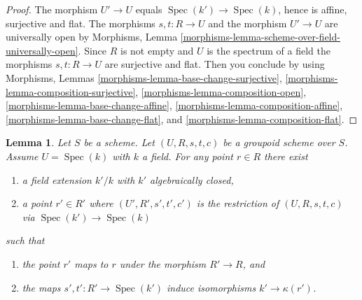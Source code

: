 \documentclass{stacks-project}
\theoremstyle{plain}
\newtheorem{lemma}[subsection]{Lemma}
\theoremstyle{definition}
\theoremstyle{remark}
\numberwithin{equation}{subsection}
\def\Spec{\mathop{\mathrm{Spec}}}
\begin{document}
\begin{proof}
The morphism $U' \to U$ equals $\Spec(k') \to \Spec(k)$,
hence is affine, surjective and flat. The morphisms $s, t : R \to U$
and the morphism $U' \to U$ are universally open by
Morphisms, Lemma \ref{morphisms-lemma-scheme-over-field-universally-open}.
Since $R$ is not empty and $U$ is the spectrum of a field the morphisms
$s, t : R \to U$ are surjective and flat. Then you conclude by using
Morphisms, Lemmas \ref{morphisms-lemma-base-change-surjective},
\ref{morphisms-lemma-composition-surjective},
\ref{morphisms-lemma-composition-open},
\ref{morphisms-lemma-base-change-affine},
\ref{morphisms-lemma-composition-affine},
\ref{morphisms-lemma-base-change-flat}, and
\ref{morphisms-lemma-composition-flat}.
\end{proof}

\begin{lemma}
\label{lemma-groupoid-on-field-explain-points}
Let $S$ be a scheme. Let $(U, R, s, t, c)$ be a groupoid scheme
over $S$. Assume $U = \Spec(k)$ with $k$ a field.
For any point $r \in R$ there exist
\begin{enumerate}
\item a field extension $k'/k$ with $k'$ algebraically closed,
\item a point $r' \in R'$ where $(U', R', s', t', c')$ is the
restriction of $(U, R, s, t, c)$ via $\Spec(k') \to \Spec(k)$
\end{enumerate}
such that
\begin{enumerate}
\item the point $r'$ maps to $r$ under the morphism $R' \to R$, and
\item the maps $s', t' : R' \to \Spec(k')$ induce isomorphisms
$k' \to \kappa(r')$.
\end{enumerate}
\end{lemma}
\end{document}
